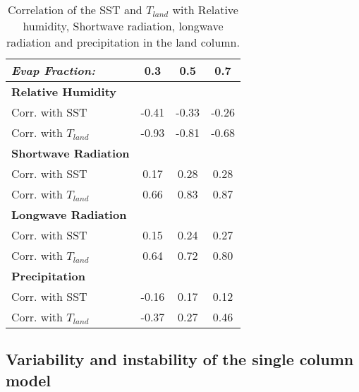 \begin{center}
	\begin{table}[ht]
		\caption{Correlation of the SST and $T_{land}$ with Relative humidity, 
		Shortwave radiation, longwave radiation and precipitation in the land 
	column.}
		\label{tab:scm_SSTVar}
		\scriptsize
	\begin{tabular}{ l  c  c  c }
		\textit{Evap Fraction:}		& 0.3   & 0.5  & 0.7 \\ \hline
		\textbf{Relative Humidity}\\%
	Corr. with SST						& -0.41  & -0.33 & -0.26\\ %
		Corr. with $T_{land}$			& -0.93  & -0.81 & -0.68\\ 
		\textbf{Shortwave Radiation}\\%
	Corr. with SST						& 0.17  & 0.28 & 0.28\\ %
		Corr. with $T_{land}$			& 0.66  & 0.83 & 0.87\\ 
		\textbf{Longwave Radiation}\\%
	Corr. with SST						& 0.15  & 0.24 & 0.27\\ %
		Corr. with $T_{land}$			& 0.64  & 0.72 & 0.80\\ 
		\textbf{Precipitation}\\%
	Corr. with SST						& -0.16  & 0.17 & 0.12\\ %
		Corr. with $T_{land}$			& -0.37  & 0.27 & 0.46\\ 
	\end{tabular}
	\end{table}
\end{center}

\subsection{Variability and instability of the single column model}
\label{instability}

